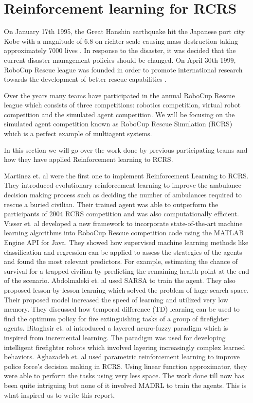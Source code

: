 \documentclass[12pt]{report}
\begin{document}
\section{Reinforcement learning for RCRS}

On January 17th 1995, the Great Hanshin earthquake hit the Japanese port city Kobe with a magnitude of 6.8 on richter scale causing mass destruction taking approximately 7000 lives \cite{Bilski} \cite{RoboCup}. In response to the disaster, it was decided that the current disaster management policies should be changed. On April 30th 1999, RoboCup Rescue league was founded in order to promote international research towards the development of better rescue capabilities \cite{Bilski}.   

Over the years many teams have participated in the annual RoboCup Rescue league which consists of three competitions: robotics competition, virtual robot competition and the simulated agent competition. We will be focusing on the simulated agent competition known as RoboCup Rescue Simulation (RCRS) which is a perfect example of multiagent systems. 

In this section we will go over the work done by previous participating teams and how they have applied Reinforcement learning to RCRS. 

Martinez et. al \cite{Martinez} were the first one to implement Reinforcement Learning to RCRS. They introduced evolutionary reinforcement learning to improve the ambulance decision making process such as deciding the number of ambulances required to rescue a buried civilian. Their trained agent was able to outperform the participants of 2004 RCRS competition and was also computationally efficient. Visser et. al \cite{Visser2018RoboCupRS} developed a new framework to incorporate state-of-the-art machine learning algorithms into RoboCup Rescue competition code using the MATLAB Engine API for Java. They showed how supervised machine learning methods like classification and regression can be applied to assess the strategies of the agents and found the most relevant predictors. For example, estimating the chance of survival for a trapped civilian by predicting the remaining health point at the end of the scenario. Abdolmaleki et. al \cite{abdolmaleki} used SARSA to train the agent. They also proposed lesson-by-lesson learning which solved the problem of huge search space. Their proposed model increased the speed of learning and utilized very low memory. They discussed how temporal difference (TD) learning can be used to find the optimum policy for fire extinguishing tasks of a group of firefighter agents. Bitaghsir et. al \cite{Bitaghsir} introduced a layered neuro-fuzzy paradigm which is inspired from incremental learning. The paradigm was used for developing intelligent firefighter robots which involved layering increasingly complex learned behaviors. Aghazadeh et. al \cite{Aghazadeh} used parametric reinforcement learning to improve police force's decision making in RCRS. Using linear function approximator, they were able to perform the tasks using very less space. The work done till now has been quite intriguing but none of it involved MADRL to train the agents. This is what inspired us to write this report. 
\end{document}
